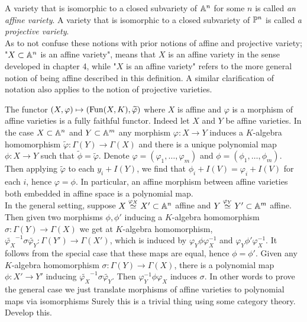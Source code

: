     \begin{definition}
        A variety that is isomorphic to a closed subvariety of $\mathbb{A}^n$ for some $n$ is called \textit{an affine variety}. A variety that is isomorphic to a closed subvariety of $\mathbb{P}^n$ is called \textit{a projective variety}.\\
        As to not confuse these notions with prior notions of affine and projective variety; "$X\subset \mathbb{A}^n$ is an affine variety", means that $X$ is an affine variety in the sense developed in chapter 4, while "$X$ is an affine variety" refers to the more general notion of being affine described in this definition. A similar clarification of notation also applies to the notion of projective varieties.  
    \end{definition}
    \begin{remark}
        The functor $(X,\varphi)\mapsto (\mathrm{Fun}(X,K),\widetilde{\varphi})$ where $X$ is affine and $\varphi$ is a morphism of affine varieties is a fully faithful functor. Indeed let $X$ and $Y$ be affine varieties. In the case $X\subset \mathbb{A}^n$ and $Y\subset \mathbb{A}^m$ any morphism $\varphi : X\rightarrow Y$ induces a $K$-algebra homomorphism $\widetilde{\varphi} : \Gamma(Y)\rightarrow \Gamma(X)$ and there is a unique polynomial map $\phi : X\rightarrow Y$ such that $\widetilde{\phi} = \widetilde{\varphi}$. Denote $\varphi = (\varphi_1,\dots,\varphi_m)$ and $\phi = (\phi_1,\dots,\phi_m)$. Then applying $\widetilde{\varphi}$ to each $y_i+I(Y)$, we find that $\phi_i + I(V) =\varphi_i+I(V)$ for each $i$, hence $\varphi=\phi$. In particular, an affine morphism between affine varieties both embedded in affine space is a polynomial map.\\
        In the general setting, suppose $X\overset{\varphi_X}{\simeq} X'\subset \mathbb{A}^n$ affine and $Y\overset{\varphi_Y}{\simeq} Y'\subset \mathbb{A}^m$ affine. Then given two morphisms $\phi,\phi'$ inducing a $K$-algebra homomorphism $\sigma : \Gamma(Y)\rightarrow \Gamma(X)$ we get at $K$-algebra homomorphism, $\widetilde{\varphi_X}^{-1}\sigma \widetilde{\varphi_Y}: \Gamma(Y')\rightarrow \Gamma(X')$, which is induced by $\varphi_Y\phi\varphi_X^{-1}$ and $\varphi_Y\phi'\varphi_X^{-1}$. It follows from the special case that these maps are equal, hence $\phi = \phi'$. Given any $K$-algebra homomorphism $\sigma : \Gamma(Y)\rightarrow \Gamma(X)$, there is a polynomial map $\phi : X'\rightarrow Y'$ inducing $\widetilde{\varphi_X}^{-1} \sigma \widetilde{\varphi_Y}$. Then $\varphi_Y^{-1} \phi \varphi_X$ induces $\sigma$. In other words to prove the general case we just translate morphisms of affine varieties to polynomial maps via isomorphisms {\Large Surely this is a trivial thing using some category theory. Develop this.}
    \end{remark}
